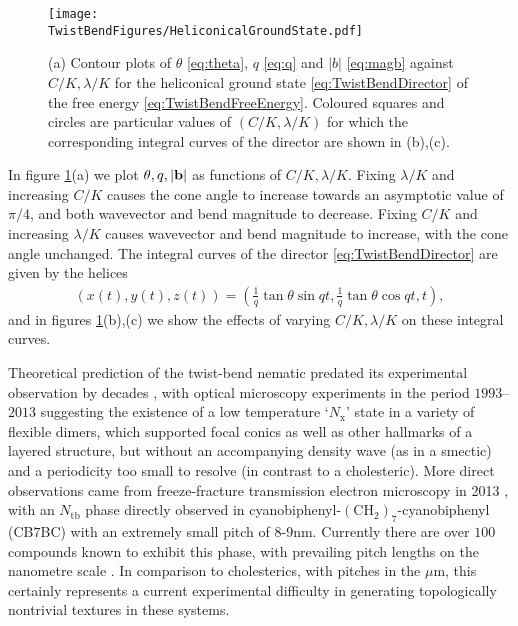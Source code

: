 \begin{figure}[htbp]
    \centering
    \texttt{[image: \\TwistBendFigures/HeliconicalGroundState.pdf]}
    \caption[Heliconical ground state of a twist-bend nematic.]{(a) Contour plots of $\theta$ \eqref{eq:theta}, $q$ \eqref{eq:q} and $|b|$ \eqref{eq:magb} against $C/K, \lambda/K$ for the heliconical ground state \eqref{eq:TwistBendDirector} of the free energy \eqref{eq:TwistBendFreeEnergy}. Coloured squares and circles are particular values of $(C/K, \lambda /K)$ for which the corresponding integral curves of the director are shown in (b),(c).}
    \label{fig:HeliconicalGroundState}
\end{figure}
In figure \ref{fig:HeliconicalGroundState}(a) we plot $\theta, q, |\mathbf{b}|$ as functions of $C/K, \lambda/K$. Fixing $\lambda/K$ and increasing $C/K$ causes the cone angle to increase towards an asymptotic value of $\pi/4$, and both wavevector and bend magnitude to decrease. Fixing $C/K$ and increasing $\lambda/K$ causes wavevector and bend magnitude to increase, with the cone angle unchanged. The integral curves of the director \eqref{eq:TwistBendDirector} are given by the helices
\begin{align}
    (x(t),y(t),z(t)) = (\frac{1}{q} \tan \theta \sin qt, \frac{1}{q} \tan \theta \cos qt,t),
\end{align}
and in figures \ref{fig:HeliconicalGroundState}(b),(c) we show the effects of varying $C/K, \lambda/K$ on these integral curves.

Theoretical prediction of the twist-bend nematic predated its experimental observation by decades \citep{Lavrentovich2018}, with optical microscopy experiments in the period $1993$--$2013$ suggesting the existence of a low temperature `$N_\mathrm{x}$' state in a variety of flexible dimers, which supported focal conics as well as other hallmarks of a layered structure, but without an accompanying density wave (as in a smectic) and a periodicity too small to resolve (in contrast to a cholesteric). More direct observations came from freeze-fracture transmission electron microscopy in 2013 \citep{Borshch2013}, with an $N_{\mathrm{tb}}$ phase directly observed in cyanobiphenyl-$(\mathrm{CH}_2)_7$-cyanobiphenyl (CB$7$BC) with an extremely small pitch of $8$-$9$nm. Currently there are over $100$ compounds known to exhibit this phase, with prevailing pitch lengths on the nanometre scale \citep{Lavrentovich2018}. In comparison to cholesterics, with pitches in the $\mu$m, this certainly represents a current experimental difficulty in generating topologically nontrivial textures in these systems. 
\label{sec:GeometryTopologyOfBend}
